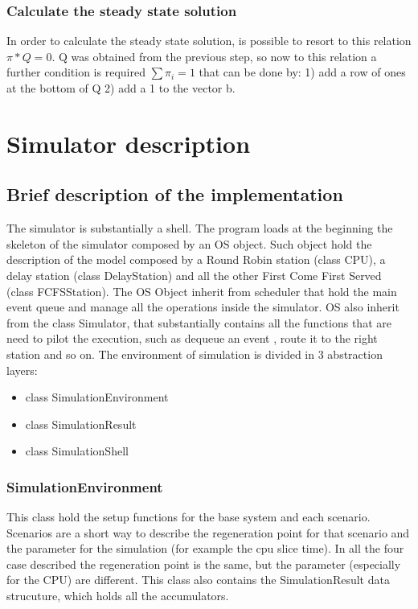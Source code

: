 \documentclass[12pt,a4paper]{article}
\begin{document}
\subsubsection{Calculate the steady state solution}

In order to calculate the steady state solution, is possible to resort to this relation $\pi * Q=0$. Q was obtained from the previous step, so now to this relation a further condition is required $\sum \pi_i = 1$ that can be done by: 1) add a row of ones at the bottom of Q 2) add a 1 to the vector b. 

\section{Simulator description}
\subsection{Brief description of the implementation}
The simulator is substantially a shell. The program loads at the beginning the skeleton of the simulator composed by an OS object. Such object hold the description of the model composed by a Round Robin station (class CPU), a delay station (class DelayStation) and all the other First Come First Served (class FCFSStation). The OS Object inherit from scheduler that hold the main event queue and manage all the operations inside the simulator. OS also inherit from the class Simulator, that substantially contains all the functions that are need to pilot the execution, such as dequeue an event , route it to the right station and so on. The environment of simulation is divided in 3 abstraction layers:
\begin{itemize}
    \item class SimulationEnvironment
    \item class SimulationResult
    \item class SimulationShell
\end{itemize}
\subsubsection{SimulationEnvironment}
This class hold the setup functions for the base system and each scenario. Scenarios are a short way to describe the regeneration point for that scenario and the parameter for the simulation (for example the cpu slice time). In all the four case described the regeneration point is the same, but the parameter (especially for the CPU) are different. This class also contains the SimulationResult data strucuture, which holds all the accumulators.
\end{document}
